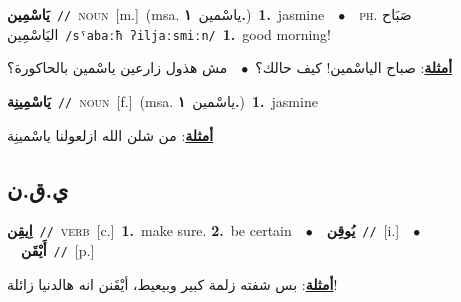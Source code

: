\documentclass[10pt,a4paper,twoside]{article} %
\begin{document}
\begin{multicols}{2}
{{{{{{\setlength\topsep{0pt}\textbf{\foreignlanguage{arabic}{يَاسْمِين}}\ {\color{gray}\texttt{//}\color{black}}\ \textsc{noun}\ [m.]\ \color{gray}(msa. \foreignlanguage{arabic}{ياسْمين}~\foreignlanguage{arabic}{\textbf{١.}})\color{black}\ \textbf{1.}~jasmine\ \ $\bullet$\ \ \textsc{ph.} \color{gray} \foreignlanguage{arabic}{صَبَاح اليَاسْمِين}\color{black}\ {\color{gray}\texttt{/{\sffamily sˤabaːħ ʔiljaːsmiːn}/}\color{black}}\ \textbf{1.}~good morning!\  \begin{flushright}\color{gray}\foreignlanguage{arabic}{\textbf{\underline{\foreignlanguage{arabic}{أمثلة}}}: صباح الياسْمين! كيف حالك؟\ $\bullet$\ \  مش هذول زارعين ياسْمين بالحاكورة؟}\end{flushright}\color{black}} \vspace{2mm}

{\setlength\topsep{0pt}\textbf{\foreignlanguage{arabic}{يَاسْمِينِة}}\ {\color{gray}\texttt{//}\color{black}}\ \textsc{noun}\ [f.]\ \color{gray}(msa. \foreignlanguage{arabic}{ياسْمين}~\foreignlanguage{arabic}{\textbf{١.}})\color{black}\ \textbf{1.}~jasmine\  \begin{flushright}\color{gray}\foreignlanguage{arabic}{\textbf{\underline{\foreignlanguage{arabic}{أمثلة}}}: من شلن الله ازلعولنا ياسْمينِة}\end{flushright}\color{black}} \vspace{2mm}

\vspace{-3mm}
\subsection*{\color{blue}\foreignlanguage{arabic}{ي.ق.ن}\color{blue}{}} 

{\setlength\topsep{0pt}\textbf{\foreignlanguage{arabic}{اِيقِن}}\ {\color{gray}\texttt{//}\color{black}}\ \textsc{verb}\ [c.]\ \textbf{1.}~make sure.  \textbf{2.}~be certain\ \ $\bullet$\ \ \setlength\topsep{0pt}\textbf{\foreignlanguage{arabic}{يُوقِن}}\ {\color{gray}\texttt{//}\color{black}}\ [i.]\ \ $\bullet$\ \ \setlength\topsep{0pt}\textbf{\foreignlanguage{arabic}{أَيْقَن}}\ {\color{gray}\texttt{//}\color{black}}\ [p.]\  \begin{flushright}\color{gray}\foreignlanguage{arabic}{\textbf{\underline{\foreignlanguage{arabic}{أمثلة}}}: بس شفته زلمة كبير وبيعيط، أيْقَنن انه هالدنيا زائلة!}\end{flushright}\color{black}} \vspace{2mm}

}}}}}
\end{multicols}
\end{document}
